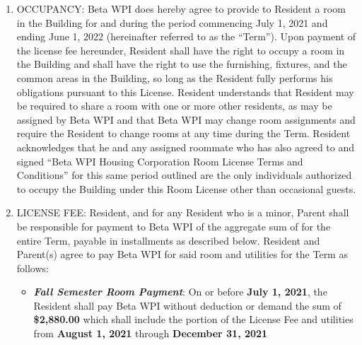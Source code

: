 \documentclass[legalpaper, 12pt]{article}
\begin{document}
\begin{enumerate} 

        \item OCCUPANCY\@:  Beta WPI does hereby agree to provide to Resident a
                room in the Building for and during the period commencing July
                1, 2021 and ending June 1, 2022 (hereinafter referred to as the
                “Term”). Upon payment of the license fee hereunder, Resident
                shall have the right to occupy a room in the Building and shall
                have the right to use the furnishing, fixtures, and the common
                areas in the Building, so long as the Resident fully performs
                his obligations pursuant to this License.  Resident understands
                that Resident may be required to share a room with one or more
                other residents, as may be assigned by Beta WPI and that Beta
                WPI may change room assignments and require the Resident to
                change rooms at any time during the Term. Resident acknowledges
                that he and any assigned roommate who has also agreed to and
                signed “Beta WPI Housing Corporation Room License Terms and
                Conditions” for this same period outlined are the only
                individuals authorized to occupy the Building under this Room
                License other than occasional guests.

        \item LICENSE FEE\@: Resident, and for any Resident who is a minor, Parent
                shall be responsible for payment to Beta WPI of the aggregate
                sum of \hspace{2cm} for the entire Term, payable in installments
                as described below. Resident and Parent(s) agree to pay Beta WPI
                for said room and utilities for the Term as follows:

                \begin{itemize} 
                                
                        \item \textbf{\textit{Fall Semester Room Payment}}: On
                                or before \textbf{July 1, 2021}, the Resident
                                shall pay Beta WPI without deduction or demand
                                the sum of \textbf{\$2,880.00} which shall
                                include the portion of the License Fee and
                                utilities from \textbf{August 1, 2021} through
                                \textbf{December 31, 2021}


\end{itemize}
\end{enumerate}
\end{document}
